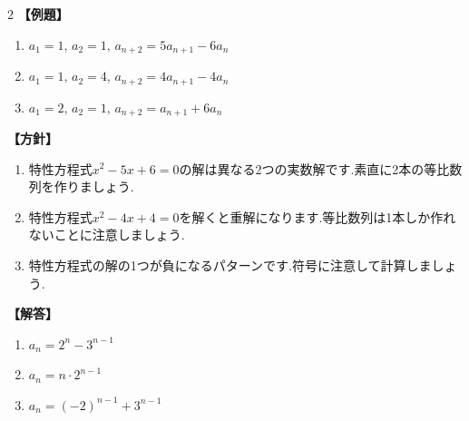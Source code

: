 \documentclass[dvipdfmx,a4paper,11pt,fleqn,openany]{jsbook}
\begin{document}
\begin{multicols*}{2}
      \noindent \textbf{【例題】}
      \begin{enumerate}[label=(\arabic*),parsep=3pt]
        \item $\displaystyle a_1=1,\,a_2=1,\, a_{n+2}=5a_{n+1}-6a_n$
        \item $\displaystyle a_1=1,\,a_2=4,\, a_{n+2}=4a_{n+1}-4a_n$
        \item $\displaystyle a_1=2,\,a_2=1,\, a_{n+2}=a_{n+1}+6a_n$
      \end{enumerate}

      \noindent\textbf{【方針】}
      \begin{enumerate}[label=(\arabic*),parsep=3pt]
        \item 特性方程式$x^2-5x+6=0$の解は異なる2つの実数解です.素直に2本の等比数列を作りましょう.
        \item 特性方程式$x^2-4x+4=0$を解くと重解になります.等比数列は1本しか作れないことに注意しましょう.
        \item 特性方程式の解の1つが負になるパターンです.符号に注意して計算しましょう.
      \end{enumerate}

      \noindent\textbf{【解答】}
      \begin{enumerate}[label=(\arabic*),parsep=3pt]
        \item $\displaystyle a_n=2^n-3^{n-1}$
        \item $\displaystyle a_n=n\cdot2^{n-1}$
        \item $\displaystyle a_n=(-2)^{n-1}+3^{n-1}$
      \end{enumerate}


\end{multicols*}
\end{document}
